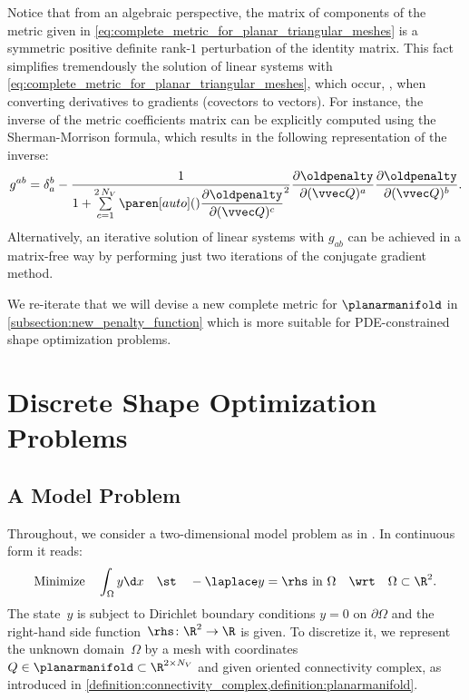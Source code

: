 \begin{remark}
	\label{remark:rank1perturbationofIdentity}
	Notice that from an algebraic perspective, the matrix of components of the metric given in \eqref{eq:complete_metric_for_planar_triangular_meshes} is a symmetric positive definite rank-$1$ perturbation of the identity matrix.
	This fact simplifies tremendously the solution of linear systems with \eqref{eq:complete_metric_for_planar_triangular_meshes}, which occur, \eg, when converting derivatives to gradients (covectors to vectors).
	For instance, the inverse of the metric coefficients matrix can be explicitly computed using the Sherman-Morrison formula, which results in the following representation of the inverse:
	\begin{equation}
		\label{eq:complete_inverse_metric_for_planar_triangular_meshes}
		g^{ab}
		=
		\delta_a^b - \dfrac{1}{1 + \sum\limits_{c=1}^{2 \, N_V} \paren[auto](){\dfrac{\partial \oldpenalty}{\partial (\vvec Q)^c}}^2} \dfrac{\partial \oldpenalty}{\partial (\vvec Q)^a} \dfrac{\partial \oldpenalty}{\partial (\vvec Q)^b}
		.
	\end{equation}
	Alternatively, an iterative solution of linear systems with $g_{ab}$ can be achieved in a matrix-free way by performing just two iterations of the conjugate gradient method.
\end{remark}

We re-iterate that we will devise a new complete metric for $\planarmanifold$ in \cref{subsection:new_penalty_function} which is more suitable for PDE-constrained shape optimization problems.


\section{Discrete Shape Optimization Problems}
\label{section:penalized_shape_optimization}

\subsection{A Model Problem}
\label{subsection:model_problem}

Throughout, we consider a two-dimensional model problem as in \cite{EtlingHerzogLoayzaWachsmuth:2020:1}.
In continuous form it reads:
\begin{equation}
	\label{eq:example_problem_continuous}
	\text{Minimize} \quad \int_\Omega y \d x
	\quad
	\text{\st}
	\quad
	- \laplace y
	=
	\rhs
	\text{ in } \Omega
	\quad
	\text{\wrt}
	\quad
	\Omega \subset \R^2
	.
\end{equation}
The state~$y$ is subject to Dirichlet boundary conditions $y = 0$ on $\partial \Omega$ and the right-hand side function~$\rhs \colon \R^2 \to \R$ is given.
To discretize it, we represent the unknown domain~$\Omega$ by a mesh with coordinates $Q \in \planarmanifold \subset \R^{2 \times N_V}$ and given oriented connectivity complex, as introduced in \cref{definition:connectivity_complex,definition:planarmanifold}.

